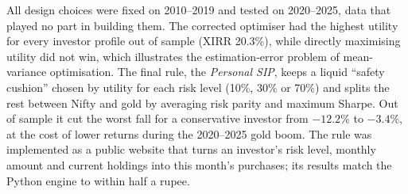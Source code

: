 \documentclass[11pt,a4paper]{article}
\begin{document}
All design choices were fixed on 2010--2019 and tested on 2020--2025, data that played no part in
building them. The corrected optimiser had the highest utility for every investor profile out of
sample (XIRR 20.3\%), while directly maximising utility did not win, which illustrates the
estimation-error problem of mean-variance optimisation. The final rule, the \emph{Personal SIP},
keeps a liquid ``safety cushion'' chosen by utility for each risk level (10\%, 30\% or 70\%) and
splits the rest between Nifty and gold by averaging risk parity and maximum Sharpe. Out of sample it
cut the worst fall for a conservative investor from $-12.2\%$ to $-3.4\%$, at the cost of lower
returns during the 2020--2025 gold boom. The rule was implemented as a public website that turns
an investor's risk level, monthly amount and current holdings into this month's purchases; its
results match the Python engine to within half a rupee.

















\end{document}
